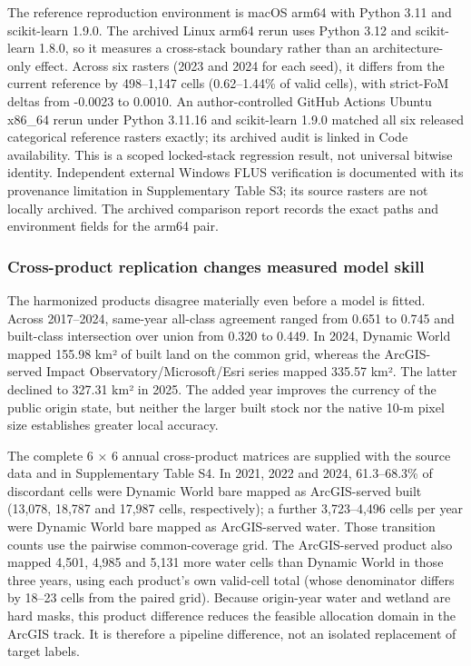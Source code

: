 The reference reproduction environment is macOS arm64 with Python 3.11
and scikit-learn 1.9.0. The archived Linux arm64 rerun uses Python 3.12
and scikit-learn 1.8.0, so it measures a cross-stack boundary rather
than an architecture-only effect. Across six rasters (2023 and 2024 for
each seed), it differs from the current reference by 498--1,147 cells
(0.62--1.44\% of valid cells), with strict-FoM deltas from -0.0023 to
0.0010. An author-controlled GitHub Actions Ubuntu x86\_64 rerun under
Python 3.11.16 and scikit-learn 1.9.0 matched all six released
categorical reference rasters exactly; its archived audit is linked in
Code availability. This is a scoped locked-stack regression result, not
universal bitwise identity. Independent external Windows FLUS
verification is documented with its provenance limitation in
Supplementary Table S3; its source rasters are not locally archived. The
archived comparison report records the exact paths and environment
fields for the arm64 pair.

\subsubsection{Cross-product replication changes measured model
skill}\label{cross-product-replication-changes-measured-model-skill}

The harmonized products disagree materially even before a model is
fitted. Across 2017--2024, same-year all-class agreement ranged from
0.651 to 0.745 and built-class intersection over union from 0.320 to
0.449. In 2024, Dynamic World mapped 155.98 km² of built land on the
common grid, whereas the ArcGIS-served Impact Observatory/Microsoft/Esri
series mapped 335.57 km². The latter declined to 327.31 km² in 2025. The
added year improves the currency of the public origin state, but neither
the larger built stock nor the native 10-m pixel size establishes
greater local accuracy.

The complete 6 × 6 annual cross-product matrices are supplied with the
source data and in Supplementary Table S4. In 2021, 2022 and 2024,
61.3--68.3\% of discordant cells were Dynamic World bare mapped as
ArcGIS-served built (13,078, 18,787 and 17,987 cells, respectively); a
further 3,723--4,496 cells per year were Dynamic World bare mapped as
ArcGIS-served water. Those transition counts use the pairwise
common-coverage grid. The ArcGIS-served product also mapped 4,501, 4,985
and 5,131 more water cells than Dynamic World in those three years,
using each product's own valid-cell total (whose denominator differs by
18--23 cells from the paired grid). Because origin-year water and
wetland are hard masks, this product difference reduces the feasible
allocation domain in the ArcGIS track. It is therefore a pipeline
difference, not an isolated replacement of target labels.

